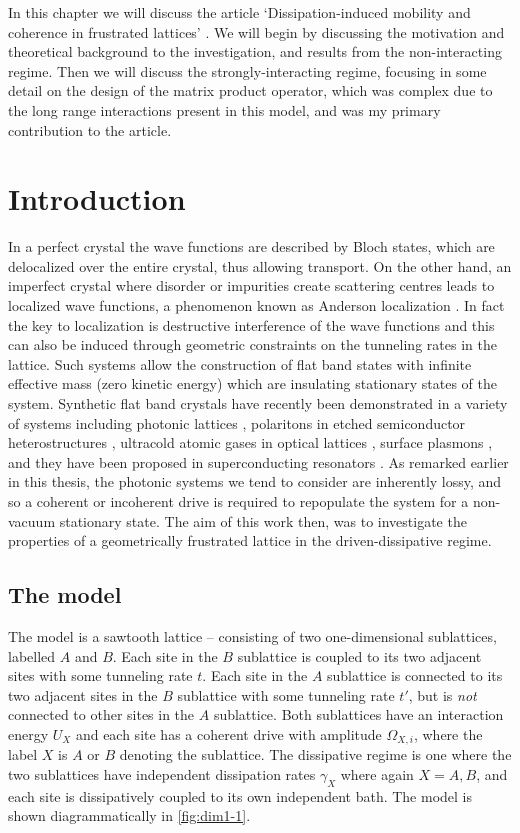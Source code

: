 In this chapter we will discuss the article `Dissipation-induced mobility and coherence in frustrated lattices' \cite{Owen2017}. We will begin by discussing the motivation and theoretical background to the investigation, and results from the non-interacting regime. Then we will discuss the strongly-interacting regime, focusing in some detail on the design of the matrix product operator, which was complex due to the long range interactions present in this model, and was my primary contribution to the article.

\section{Introduction}
In a perfect crystal the wave functions are described by Bloch states, which are delocalized over the entire crystal, thus allowing transport. On the other hand, an imperfect crystal where disorder or impurities create scattering centres leads to localized wave functions, a phenomenon known as Anderson localization \cite{Anderson1958,Lee1985,Segev2013}. In fact the key to localization is destructive interference of the wave functions and this can also be induced through geometric constraints on the tunneling rates in the lattice. Such systems allow the construction of flat band states with infinite effective mass (zero kinetic energy) which are insulating stationary states of the system. Synthetic flat band crystals have recently been demonstrated in a variety of systems including photonic lattices \cite{Guzman-Silva2014,Vicencio2015,Mukherjee2015,Mukherjee2015a}, polaritons in etched semiconductor heterostructures \cite{Jacqmin2014,Baboux2016}, ultracold atomic gases in optical lattices \cite{Taie2015}, surface plasmons \cite{Nakata2012,Kajiwara2016}, and they have been proposed in superconducting resonators \cite{Yang2016}. As remarked earlier in this thesis, the photonic systems we tend to consider are inherently lossy, and so a coherent or incoherent drive is required to repopulate the system for a non-vacuum stationary state. The aim of this work then, was to investigate the properties of a geometrically frustrated lattice in the driven-dissipative regime.  

\subsection{The model}
The model is a sawtooth lattice -- consisting of two one-dimensional sublattices, labelled \(A\) and \(B\). Each site in the \(B\) sublattice is coupled to its two adjacent sites with some tunneling rate \(t\). Each site in the \(A\) sublattice is connected to its two adjacent sites in the \(B\) sublattice with some tunneling rate \(t'\), but is \emph{not} connected to other sites in the \(A\) sublattice. Both sublattices have an interaction energy \(U_{X}\) and each site has a coherent drive with amplitude \(\Omega_{X,i}\), where the label \(X\) is \(A\) or \(B\) denoting the sublattice. The dissipative regime is one where the two sublattices have independent dissipation rates \(\gamma_{X}\) where again \(X = A,B\), and each site is dissipatively coupled to its own independent bath. The model is shown diagrammatically in \cref{fig:dim1-1}.


